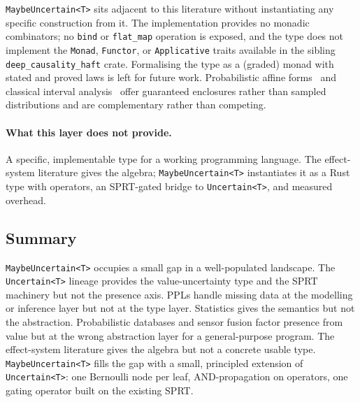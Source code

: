 \texttt{MaybeUncertain<T>} sits adjacent to this literature without
instantiating any specific construction from it. The implementation provides
no monadic combinators; no \texttt{bind} or \texttt{flat\_map} operation is
exposed, and the type does not implement the \texttt{Monad},
\texttt{Functor}, or \texttt{Applicative} traits available in the sibling
\texttt{deep\_causality\_haft} crate. Formalising the type as a (graded)
monad with stated and proved laws is left for future work. Probabilistic
affine forms~\cite{bouissou2016probaffine} and classical interval
analysis~\cite{moore1966interval} offer guaranteed enclosures rather than
sampled distributions and are complementary rather than competing.

\paragraph{What this layer does not provide.} A specific, implementable type
for a working programming language. The effect-system literature gives the
algebra; \texttt{MaybeUncertain<T>} instantiates it as a Rust type with
operators, an SPRT-gated bridge to \texttt{Uncertain<T>}, and measured
overhead.

\subsection{Summary}

\texttt{MaybeUncertain<T>} occupies a small gap in a well-populated landscape.
The \texttt{Uncertain<T>} lineage provides the value-uncertainty type and the
SPRT machinery but not the presence axis. PPLs handle missing data at the
modelling or inference layer but not at the type layer. Statistics gives the
semantics but not the abstraction. Probabilistic databases and sensor fusion
factor presence from value but at the wrong abstraction layer for a
general-purpose program. The effect-system literature gives the algebra but
not a concrete usable type. \texttt{MaybeUncertain<T>} fills the gap with a
small, principled extension of \texttt{Uncertain<T>}: one Bernoulli node per
leaf, AND-propagation on operators, one gating operator built on the existing
SPRT.
